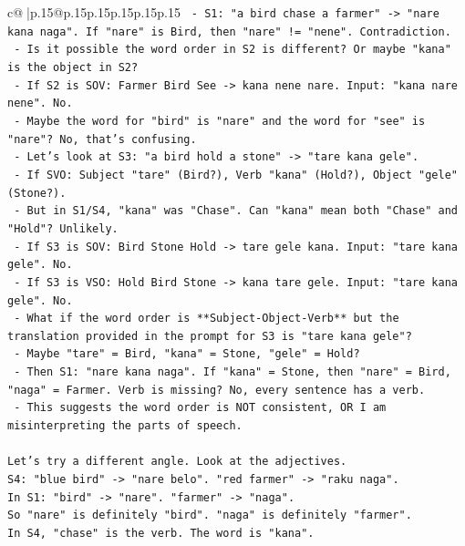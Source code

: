 \documentclass{article}
\begin{document}
{\begin{supertabular}{c@{$\;$}|p{.15\linewidth}@{}p{.15\linewidth}p{.15\linewidth}p{.15\linewidth}p{.15\linewidth}p{.15\linewidth}}
{{{\texttt{               {-} S1: "a bird chase a farmer" {-}> "nare kana naga". If "nare" is Bird, then "nare" != "nene". Contradiction.} \\
\texttt{             {-} Is it possible the word order in S2 is different? Or maybe "kana" is the object in S2?} \\
\texttt{               {-} If S2 is SOV: Farmer Bird See {-}> kana nene nare. Input: "kana nare nene". No.} \\
\texttt{             {-} Maybe the word for "bird" is "nare" and the word for "see" is "nare"? No, that's confusing.} \\
\texttt{             {-} Let's look at S3: "a bird hold a stone" {-}> "tare kana gele".} \\
\texttt{               {-} If SVO: Subject "tare" (Bird?), Verb "kana" (Hold?), Object "gele" (Stone?).} \\
\texttt{               {-} But in S1/S4, "kana" was "Chase". Can "kana" mean both "Chase" and "Hold"? Unlikely.} \\
\texttt{               {-} If S3 is SOV: Bird Stone Hold {-}> tare gele kana. Input: "tare kana gele". No.} \\
\texttt{               {-} If S3 is VSO: Hold Bird Stone {-}> kana tare gele. Input: "tare kana gele". No.} \\
\texttt{               {-} What if the word order is **Subject{-}Object{-}Verb** but the translation provided in the prompt for S3 is "tare kana gele"?} \\
\texttt{                 {-} Maybe "tare" = Bird, "kana" = Stone, "gele" = Hold?} \\
\texttt{                 {-} Then S1: "nare kana naga". If "kana" = Stone, then "nare" = Bird, "naga" = Farmer. Verb is missing? No, every sentence has a verb.} \\
\texttt{                 {-} This suggests the word order is NOT consistent, OR I am misinterpreting the parts of speech.} \\
\\ 
\texttt{Let's try a different angle. Look at the adjectives.} \\
\texttt{S4: "blue bird" {-}> "nare belo". "red farmer" {-}> "raku naga".} \\
\texttt{In S1: "bird" {-}> "nare". "farmer" {-}> "naga".} \\
\texttt{So "nare" is definitely "bird". "naga" is definitely "farmer".} \\
\texttt{In S4, "chase" is the verb. The word is "kana".} \\
}}}
\end{supertabular}}
\end{document}
